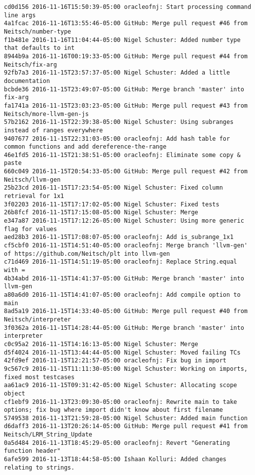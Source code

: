 \begin{lstlisting}
cd0d156 2016-11-16T15:50:39-05:00 oracleofnj: Start processing command line args
4a1fcac 2016-11-16T13:55:46-05:00 GitHub: Merge pull request #46 from Neitsch/number-type
f1b481e 2016-11-16T11:04:44-05:00 Nigel Schuster: Added number type that defaults to int
8944b9a 2016-11-16T00:19:33-05:00 GitHub: Merge pull request #44 from Neitsch/fix-arg
92fb7a3 2016-11-15T23:57:37-05:00 Nigel Schuster: Added a little documentation
bcbde36 2016-11-15T23:49:07-05:00 GitHub: Merge branch 'master' into fix-arg
fa1741a 2016-11-15T23:03:23-05:00 GitHub: Merge pull request #43 from Neitsch/more-llvm-gen-js
57b2162 2016-11-15T22:39:38-05:00 Nigel Schuster: Using subranges instead of ranges everywhere
9407677 2016-11-15T22:31:03-05:00 oracleofnj: Add hash table for common functions and add dereference-the-range
46e1fd5 2016-11-15T21:38:51-05:00 oracleofnj: Eliminate some copy & paste
660c049 2016-11-15T20:54:33-05:00 GitHub: Merge pull request #42 from Neitsch/llvm-gen
25b23cd 2016-11-15T17:23:54-05:00 Nigel Schuster: Fixed column retrieval for 1x1
3f02203 2016-11-15T17:17:02-05:00 Nigel Schuster: Fixed tests
26b8fcf 2016-11-15T17:15:08-05:00 Nigel Schuster: Merge
e347a87 2016-11-15T17:12:26-05:00 Nigel Schuster: Using more generic flag for values
aed28b3 2016-11-15T17:08:07-05:00 oracleofnj: Add is_subrange_1x1
cf5cbf0 2016-11-15T14:51:40-05:00 oracleofnj: Merge branch 'llvm-gen' of https://github.com/Neitsch/plt into llvm-gen
c71d469 2016-11-15T14:51:19-05:00 oracleofnj: Replace String.equal with =
4b34abd 2016-11-15T14:41:37-05:00 GitHub: Merge branch 'master' into llvm-gen
a80a6d0 2016-11-15T14:41:07-05:00 oracleofnj: Add compile option to main
8ad5a19 2016-11-15T14:33:40-05:00 GitHub: Merge pull request #40 from Neitsch/interpreter
3f0362a 2016-11-15T14:28:44-05:00 GitHub: Merge branch 'master' into interpreter
c0c95a2 2016-11-15T14:16:13-05:00 Nigel Schuster: Merge
d5f4024 2016-11-15T13:44:44-05:00 Nigel Schuster: Moved failing TCs
42fd9ef 2016-11-15T12:21:57-05:00 oracleofnj: Fix bug in import
9c567c9 2016-11-15T11:11:30-05:00 Nigel Schuster: Working on imports, fixed most testcases
aa61ac9 2016-11-15T09:31:42-05:00 Nigel Schuster: Allocating scope object
cf1ebf9 2016-11-13T23:09:30-05:00 oracleofnj: Rewrite main to take options; fix bug where import didn't know about first filename
5749538 2016-11-13T21:59:28-05:00 Nigel Schuster: Added main function
d6daff3 2016-11-13T20:26:14-05:00 GitHub: Merge pull request #41 from Neitsch/LRM_String_Update
0a5d484 2016-11-13T18:45:29-05:00 oracleofnj: Revert "Generating function header"
6afe599 2016-11-13T18:44:58-05:00 Ishaan Kolluri: Added changes relating to strings.

\end{lstlisting}
